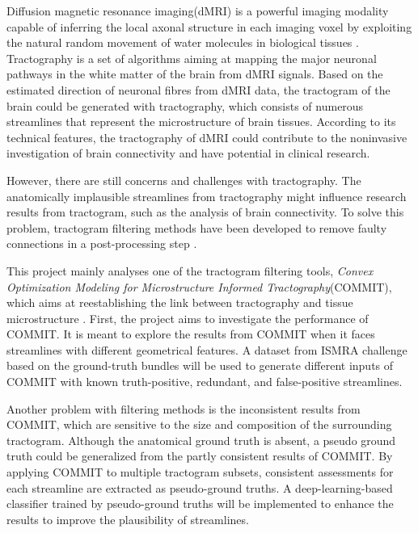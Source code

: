 Diffusion magnetic resonance imaging(dMRI) is a powerful imaging modality 
capable of inferring the local axonal structure in each imaging voxel 
by exploiting the natural random movement of water molecules 
in biological tissues \cite{intro}. Tractography is a set of algorithms aiming at 
mapping the major neuronal pathways in the white matter of the brain from dMRI signals. 
Based on the estimated direction of neuronal fibres from dMRI data, the tractogram of 
the brain could be generated with tractography, which consists of numerous streamlines that 
represent the microstructure of brain tissues. 
According to its technical features, the tractography of dMRI could contribute to 
the noninvasive investigation of brain connectivity and have potential in clinical research. 

However, there are still concerns and challenges with tractography. 
The anatomically implausible streamlines from tractography might influence 
research results from tractogram, such as the analysis of brain connectivity. 
To solve this problem, tractogram filtering methods have been developed to 
remove faulty connections in a post-processing step \cite{hain2022assessing}.

This project mainly analyses one of the tractogram filtering tools,
\textit{Convex Optimization Modeling for Microstructure Informed Tractography}(COMMIT), 
which aims at reestablishing the link between tractography and tissue microstructure \cite{daducci2014commit}. 
First, the project aims to investigate the performance of COMMIT. 
It is meant to explore the results from COMMIT when it faces streamlines with 
different geometrical features. A dataset from ISMRA challenge\cite{maier_hein_klaus_2015_572345} 
based on the ground-truth bundles will be used to generate different inputs of 
COMMIT with known truth-positive, redundant, and false-positive streamlines.

Another problem with filtering methods is the inconsistent results from COMMIT, 
which are sensitive to the size and composition of the surrounding tractogram. 
Although the anatomical ground truth is absent, a pseudo ground truth could be 
generalized from the partly consistent results of COMMIT. By applying COMMIT to 
multiple tractogram subsets, consistent assessments for each streamline are extracted
 as pseudo-ground truths. A deep-learning-based classifier trained by pseudo-ground truths
  will be implemented to enhance the results to improve the plausibility of streamlines.

